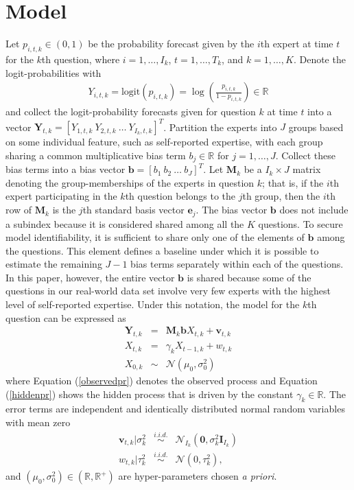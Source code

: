 \documentclass[aoas, preprint]{imsart}
\numberwithin{equation}{section}
\theoremstyle{plain}
\newcommand{\R}{\mathbb{R}}
\newcommand{\logit}{\text{logit}}
\begin{document}
\section{Model}
\label{model}
Let $p_{i,t,k} \in (0,1)$ be the probability forecast given by the $i$th expert at time $t$ for the $k$th question, where $i = 1, \dots, I_k$, $t = 1, \dots, T_k$, and $k = 1, \dots, K$. Denote the logit-probabilities with 
\begin{eqnarray*}
Y_{i,t,k} = \logit(p_{i,t,k}) = \log \left( \frac{p_{i,t,k}}{1-p_{i,t,k}}\right) \in \R
\end{eqnarray*}
and collect the logit-probability forecasts given for question $k$ at time $t$ into a vector $\boldsymbol{Y}_{t,k} = [Y_{1,t,k}\ Y_{2,t,k}\ \dots\ Y_{I_{k},t,k}]^T$. Partition the experts into $J$ groups based on some individual feature, such as self-reported expertise, with each group sharing a common multiplicative bias term $b_{j} \in \R$ for $j = 1, \dots, J$. Collect these bias terms into a bias vector $\boldsymbol{b} = [b_{1}\ b_{2}\ \dots\ b_{J}]^T$. Let $\boldsymbol{M}_k$ be a $I_k \times J$ matrix denoting  the group-memberships of the experts in question $k$; that is, if the $i$th expert participating in the $k$th question belongs to the $j$th group, then the $i$th row of $\boldsymbol{M}_k$ is the $j$th standard basis vector $\boldsymbol{e}_j$. The bias vector $\boldsymbol{b}$ does not include a subindex because it is considered shared among all the $K$ questions. To secure model identifiability, it is sufficient to share only one of the elements of $\boldsymbol{b}$ among the questions. This element defines a baseline under which it is possible to estimate the remaining $J-1$ bias terms separately within each of the questions. In this paper, however, the entire vector $\boldsymbol{b}$ is shared because some of the questions in our real-world data set involve very few experts with the highest level of self-reported expertise. Under this notation, the model for the $k$th question can be expressed as 
\begin{eqnarray}
\boldsymbol{Y}_{t, k} &=&  \boldsymbol{M}_k \boldsymbol{b} X_{t, k} + \boldsymbol{v}_{t, k} \label{observedpr} \\
X_{t, k} &=& \gamma_k X_{t-1, k} + w_{t, k} \label{hiddenpr}\\
X_{0,k} &\sim& \mathcal{N}(\mu_0, \sigma^2_0) \nonumber
\end{eqnarray}
where Equation (\ref{observedpr}) denotes the observed process and Equation (\ref{hiddenpr}) shows the hidden process that is driven by the constant $\gamma_k \in \R$. The error terms are independent and identically distributed normal random variables with mean zero
\begin{eqnarray*}
\boldsymbol{v}_{t, k} | \sigma^2_k &\stackrel{i.i.d.}{\sim}& \mathcal{N}_{I_k}(\boldsymbol{0}, \sigma^2_k \boldsymbol{I}_{I_k})\\
w_{t, k} | \tau^2_k &\stackrel{i.i.d.}{\sim}& \mathcal{N}(0, \tau^2_k),
\end{eqnarray*}
and $(\mu_0, \sigma_0^2) \in (\R, \R^+)$ are hyper-parameters chosen \textit{a priori}. 
\end{document}
